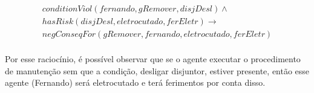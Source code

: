 \begin{eqnarray}\label{applicationCodViolIntrodCase}\nonumber
	conditionViol(fernando,gRemover,disjDesl)  \wedge \\
	hasRisk(disjDesl, eletrocutado, ferEletr) \to \nonumber \\ 
	negConseqFor(gRemover,fernando,eletrocutado,ferEletr) \nonumber \\ 
\end{eqnarray}	

Por esse raciocínio, é possível observar que se o agente executar o procedimento de manutenção sem que a condição, desligar disjuntor, estiver presente, então esse agente (Fernando) será eletrocutado e terá ferimentos por conta disso. 